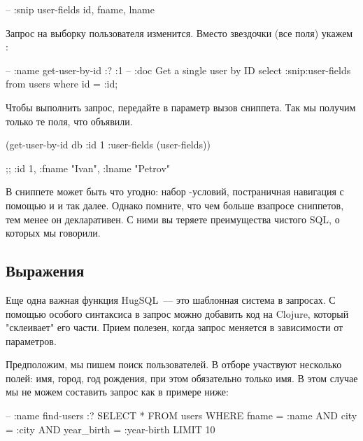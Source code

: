 \begin{english}
  \begin{sql}
-- :snip user-fields
id, fname, lname
  \end{sql}
\end{english}

Запрос на выборку пользователя изменится. Вместо звездочки (все поля) укажем :

\begin{english}
  \begin{sql}
-- :name get-user-by-id :? :1
-- :doc Get a single user by ID
select :snip:user-fields from users
where id = :id;
  \end{sql}
\end{english}

Чтобы выполнить запрос, передайте в параметр  вызов сниппета. Так мы получим только те поля, что объявили.

\begin{english}
  \begin{clojure}
(get-user-by-id db {:id 1 :user-fields (user-fields)})

;; {:id 1, :fname "Ivan", :lname "Petrov"}
  \end{clojure}
\end{english}

В сниппете может быть что угодно: набор -условий, постраничная навигация с помощью  и  и так далее. Однако помните, что чем больше взапросе сниппетов, тем менее он декларативен. С ними вы теряете преимущества чистого SQL, о которых мы говорили.

\subsection{Выражения}

Еще одна важная функция HugSQL~--- это шаблонная система в запросах. С помощью особого синтаксиса в запрос можно добавить код на Clojure, который "склеивает" его части. Прием полезен, когда запрос меняется в зависимости от параметров.

Предположим, мы пишем поиск пользователей. В отборе участвуют несколько полей: имя, город, год рождения, при этом обязательно только имя. В этом случае мы не можем составить запрос как в примере ниже:

\begin{english}
  \begin{sql}
-- :name find-users :?
SELECT * FROM users
WHERE fname = :name
  AND city = :city
  AND year_birth = :year-birth
LIMIT 10
  \end{sql}
\end{english}

